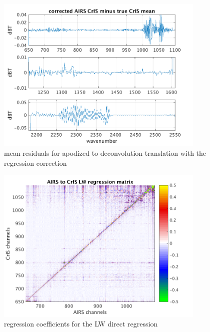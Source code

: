 \documentclass[11pt]{article}
\begin{document}
\begin{figure} %
  \centering
  \includegraphics[height=7.5cm]{slackfigs/ap_decon_corr.png}
  \caption{mean residuals for apodized {\airs} to {\cris}
    deconvolution translation with the regression correction}
  \label{dreg2}
\end{figure}

\begin{figure} %
  \centering
  \includegraphics[height=7.5cm]{slackfigs/full_7377_LW_regr_mat.png}
  \caption{regression coefficients for the LW direct regression}
  \label{dreg3}
\end{figure}

% 
\end{document}
